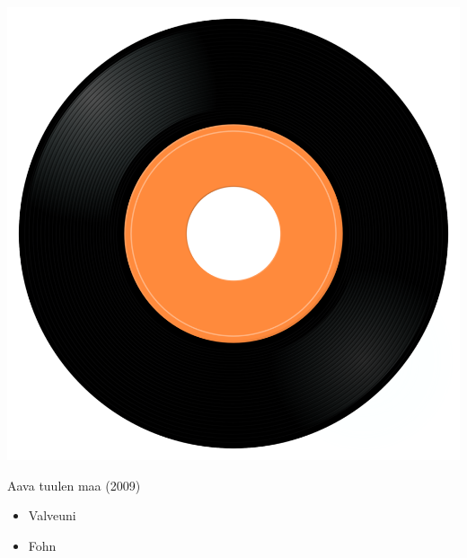 \begin{minipage}[t]{0.25\textwidth}
\captionsetup{type=figure}
\includegraphics[width=\textwidth]{Images/cover.png}
\caption*{Aava tuulen maa (2009)}
\end{minipage}
\begin{minipage}[t]{0.25\textwidth}\vspace{0pt}
\begin{itemize}[nosep,leftmargin=1em,labelwidth=*,align=left]
	\setlength{\itemsep}{0pt}
	\item Valveuni
	\item Fohn
\end{itemize}
\end{minipage}
